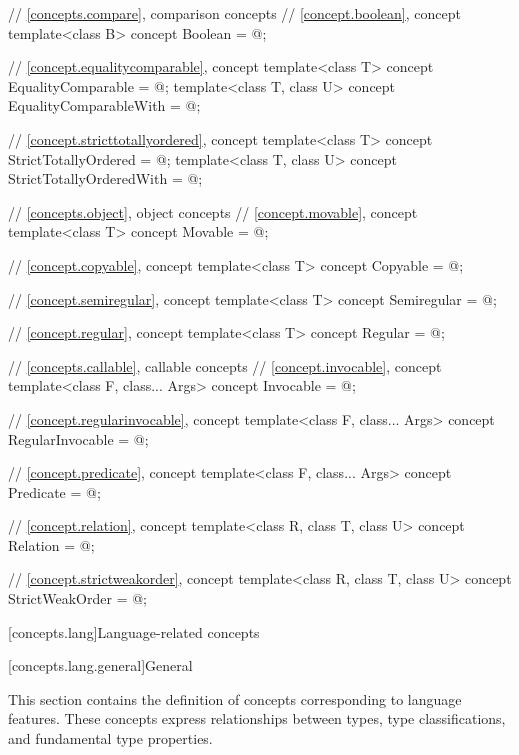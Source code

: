 \begin{codeblock}
{  // \ref{concepts.compare}, comparison concepts
  // \ref{concept.boolean}, concept 
  template<class B>
    concept Boolean = @\seebelow@;

  // \ref{concept.equalitycomparable}, concept 
  template<class T>
    concept EqualityComparable = @\seebelow@;
  template<class T, class U>
    concept EqualityComparableWith = @\seebelow@;

  // \ref{concept.stricttotallyordered}, concept 
  template<class T>
    concept StrictTotallyOrdered = @\seebelow@;
  template<class T, class U>
    concept StrictTotallyOrderedWith = @\seebelow@;

  // \ref{concepts.object}, object concepts
  // \ref{concept.movable}, concept 
  template<class T>
    concept Movable = @\seebelow@;

  // \ref{concept.copyable}, concept 
  template<class T>
    concept Copyable = @\seebelow@;

  // \ref{concept.semiregular}, concept 
  template<class T>
    concept Semiregular = @\seebelow@;

  // \ref{concept.regular}, concept 
  template<class T>
    concept Regular = @\seebelow@;

  // \ref{concepts.callable}, callable concepts
  // \ref{concept.invocable}, concept 
  template<class F, class... Args>
    concept Invocable = @\seebelow@;

  // \ref{concept.regularinvocable}, concept 
  template<class F, class... Args>
    concept RegularInvocable = @\seebelow@;

  // \ref{concept.predicate}, concept 
  template<class F, class... Args>
    concept Predicate = @\seebelow@;

  // \ref{concept.relation}, concept 
  template<class R, class T, class U>
    concept Relation = @\seebelow@;

  // \ref{concept.strictweakorder}, concept 
  template<class R, class T, class U>
    concept StrictWeakOrder = @\seebelow@;
}
\end{codeblock}

[concepts.lang]{Language-related concepts}

[concepts.lang.general]{General}

\pnum
This section contains the definition of concepts corresponding to language
features. These concepts express relationships between types, type
classifications, and fundamental type properties.

